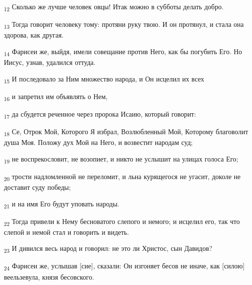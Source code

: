 \begin{tcolorbox}
\textsubscript{12} Сколько же лучше человек овцы! Итак можно в субботы делать добро.
\end{tcolorbox}
\begin{tcolorbox}
\textsubscript{13} Тогда говорит человеку тому: протяни руку твою. И он протянул, и стала она здорова, как другая.
\end{tcolorbox}
\begin{tcolorbox}
\textsubscript{14} Фарисеи же, выйдя, имели совещание против Него, как бы погубить Его. Но Иисус, узнав, удалился оттуда.
\end{tcolorbox}
\begin{tcolorbox}
\textsubscript{15} И последовало за Ним множество народа, и Он исцелил их всех
\end{tcolorbox}
\begin{tcolorbox}
\textsubscript{16} и запретил им объявлять о Нем,
\end{tcolorbox}
\begin{tcolorbox}
\textsubscript{17} да сбудется реченное через пророка Исаию, который говорит:
\end{tcolorbox}
\begin{tcolorbox}
\textsubscript{18} Се, Отрок Мой, Которого Я избрал, Возлюбленный Мой, Которому благоволит душа Моя. Положу дух Мой на Него, и возвестит народам суд;
\end{tcolorbox}
\begin{tcolorbox}
\textsubscript{19} не воспрекословит, не возопиет, и никто не услышит на улицах голоса Его;
\end{tcolorbox}
\begin{tcolorbox}
\textsubscript{20} трости надломленной не переломит, и льна курящегося не угасит, доколе не доставит суду победы;
\end{tcolorbox}
\begin{tcolorbox}
\textsubscript{21} и на имя Его будут уповать народы.
\end{tcolorbox}
\begin{tcolorbox}
\textsubscript{22} Тогда привели к Нему бесноватого слепого и немого; и исцелил его, так что слепой и немой стал и говорить и видеть.
\end{tcolorbox}
\begin{tcolorbox}
\textsubscript{23} И дивился весь народ и говорил: не это ли Христос, сын Давидов?
\end{tcolorbox}
\begin{tcolorbox}
\textsubscript{24} Фарисеи же, услышав [сие], сказали: Он изгоняет бесов не иначе, как [силою] веельзевула, князя бесовского.
\end{tcolorbox}
